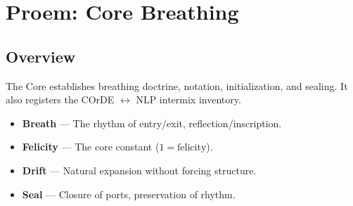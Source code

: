 
\chapter{Proem: Core Breathing}
\label{ch:core-breathing}


\section*{Overview}
The Core establishes breathing doctrine, notation, initialization, and sealing.
It also registers the COrDE \(\leftrightarrow\) NLP intermix inventory.

\begin{itemize}
  \item \textbf{Breath} — The rhythm of entry/exit, reflection/inscription.
  \item \textbf{Felicity} — The core constant (\(1 = \text{felicity}\)).
  \item \textbf{Drift} — Natural expansion without forcing structure.
  \item \textbf{Seal} — Closure of ports, preservation of rhythm.
\end{itemize}










